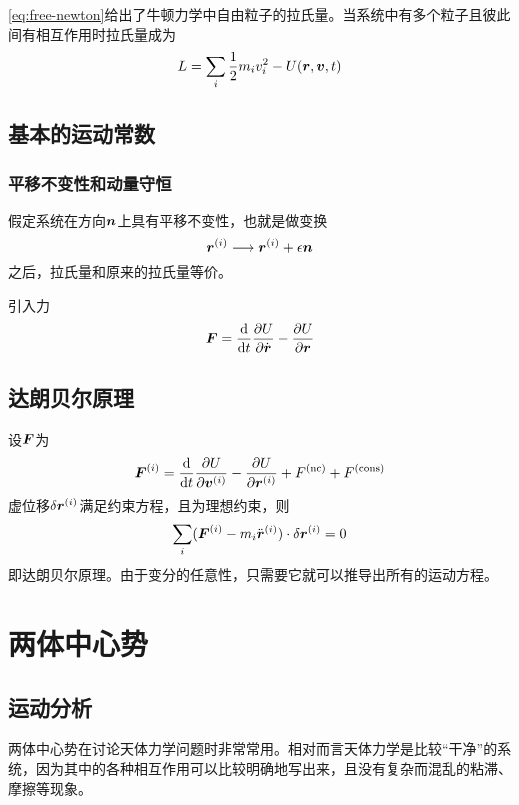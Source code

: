 \documentclass[UTF8, a4paper]{ctexart}
\begin{document}
\eqref{eq:free-newton}给出了牛顿力学中自由粒子的拉氏量。当系统中有多个粒子且彼此间有相互作用时拉氏量成为
\begin{equation}
    L = \sum_i \frac{1}{2} m_i v_i^2 - U(\vb*{r}, \vb*{v}, t)
    \label{eq:interaction}
\end{equation}

\subsection{基本的运动常数}

\subsubsection{平移不变性和动量守恒}

假定系统在方向$\vb*{n}$上具有平移不变性，也就是做变换
\[
    \vb*{r}^{(i)} \longrightarrow \vb*{r}^{(i)} + \epsilon \vb*{n}
\]
之后，拉氏量和原来的拉氏量等价。

引入力
\begin{equation}
    \vb*{F} = \dv{t} \pdv{U}{\dot{\vb*{r}}} - \pdv{U}{\vb*{r}}
\end{equation}

\subsection{达朗贝尔原理}

设$\vb*{F}$为
\begin{equation}
    \vb*{F}^{(i)} = \dv{t} \pdv{U}{\vb*{v}^{(i)}} - \pdv{U}{\vb*{r}^{(i)}} + F^\text{(nc)} + F^\text{(cons)}
\end{equation}
虚位移$\var{\vb*{r}^{(i)}}$满足约束方程，且为理想约束，则
\begin{equation}
    \sum_i (\vb*{F}^{(i)} - m_i \ddot{\vb*{r}}^{(i)}) \cdot \var{\vb*{r}^{(i)}} = 0
\end{equation}
即达朗贝尔原理。由于变分的任意性，只需要它就可以推导出所有的运动方程。

\section{两体中心势}\label{sec:two-body}

\subsection{运动分析}

两体中心势在讨论天体力学问题时非常常用。相对而言天体力学是比较“干净”的系统，因为其中的各种相互作用可以比较明确地写出来，且没有复杂而混乱的粘滞、摩擦等现象。
\end{document}
